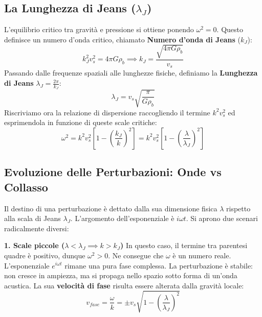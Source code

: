 \documentclass[11pt,a4paper]{report}
\begin{document}
\subsection{La Lunghezza di Jeans ($\lambda_J$)}
L'equilibrio critico tra gravità e pressione si ottiene ponendo $\omega^2 = 0$. Questo definisce un numero d'onda critico, chiamato \textbf{Numero d'onda di Jeans} ($k_J$):
\begin{equation}
k_J^2 v_s^2 = 4\pi G \rho_b \implies k_J = \frac{\sqrt{4\pi G \rho_b}}{v_s}
\end{equation}
Passando dalle frequenze spaziali alle lunghezze fisiche, definiamo la \textbf{Lunghezza di Jeans} $\lambda_J = \frac{2\pi}{k_J}$:
\begin{equation}
\lambda_J = v_s \sqrt{\frac{\pi}{G\rho_b}}
\end{equation}
Riscriviamo ora la relazione di dispersione raccogliendo il termine $k^2 v_s^2$ ed esprimendola in funzione di queste scale critiche:
\begin{equation}
\omega^2 = k^2 v_s^2 \left[ 1 - \left(\frac{k_J}{k}\right)^2 \right] = k^2 v_s^2 \left[ 1 - \left(\frac{\lambda}{\lambda_J}\right)^2 \right]
\end{equation}

\subsection{Evoluzione delle Perturbazioni: Onde vs Collasso}
Il destino di una perturbazione è dettato dalla sua dimensione fisica $\lambda$ rispetto alla scala di Jeans $\lambda_J$. L'argomento dell'esponenziale è $i\omega t$. Si aprono due scenari radicalmente diversi:

\textbf{1. Scale piccole ($\lambda < \lambda_J \implies k > k_J$)}
In questo caso, il termine tra parentesi quadre è positivo, dunque $\omega^2 > 0$. Ne consegue che $\omega$ è un numero reale.
L'esponenziale $e^{i\omega t}$ rimane una pura fase complessa. La perturbazione è stabile: non cresce in ampiezza, ma si propaga nello spazio sotto forma di un'onda acustica. La sua \textbf{velocità di fase} risulta essere alterata dalla gravità locale:
\begin{equation}
v_{fase} = \frac{\omega}{k} = \pm v_s \sqrt{ 1 - \left(\frac{\lambda}{\lambda_J}\right)^2 }
\end{equation}
\end{document}
